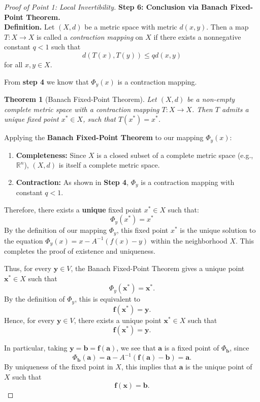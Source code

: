 \documentclass{article}
\newtheorem{theorem}{Theorem}
\begin{document}
\begin{proof}[Proof of Point 1: Local Invertibility]
\textbf{Step 6: Conclusion via Banach Fixed-Point Theorem.} \\

\textbf{Definition.} Let $(X, d)$ be a metric space with metric $d(x, y)$. Then a map $T: X \to X$ is called a \textit{contraction mapping} on $X$ if there exists a nonnegative constant $q < 1$ such that
\[
d(T(x), T(y)) \le q d(x, y)
\]
for all $x, y \in X$.

From \textbf{step 4} we know that $\Phi_y(x)$ is a contraction mapping.

\begin{theorem}[Banach Fixed-Point Theorem]
Let $(X, d)$ be a non-empty complete metric space with a contraction mapping $T: X \to X$. Then $T$ admits a unique fixed point $x^* \in X$, such that $T(x^*) = x^*$.
\end{theorem}

Applying the \textbf{Banach Fixed-Point Theorem} to our mapping $\Phi_y(x)$:
\begin{enumerate}
    \item \textbf{Completeness:} Since $X$ is a closed subset of a complete metric space (e.g., $\mathbb{R}^n$), $(X, d)$ is itself a complete metric space.
    \item \textbf{Contraction:} As shown in \textbf{Step 4}, $\Phi_y$ is a contraction mapping with constant $q < 1$.
\end{enumerate}

Therefore, there exists a \textbf{unique} fixed point $x^* \in X$ such that:
\[
\Phi_y(x^*) = x^*
\]
By the definition of our mapping $\Phi_y$, this fixed point $x^*$ is the unique solution to the equation $\Phi_y(x) = x - A^{-1}(f(x) - y)$  within the neighborhood $X$. This completes the proof of existence and uniqueness.

Thus, for every $\mathbf{y}\in V$, the Banach Fixed-Point Theorem gives a unique point $\mathbf{x}^*\in X$ such that
\[
\Phi_y(\mathbf{x}^*)=\mathbf{x}^*.
\]
By the definition of $\Phi_y$, this is equivalent to
\[
\mathbf{f}(\mathbf{x}^*)=\mathbf{y}.
\]
Hence, for every $\mathbf{y}\in V$, there exists a unique point $\mathbf{x}^*\in X$ such that
\[
\mathbf{f}(\mathbf{x}^*)=\mathbf{y}.
\]

In particular, taking $\mathbf{y}=\mathbf{b}=\mathbf{f}(\mathbf{a})$, we see that $\mathbf{a}$ is a fixed point of $\Phi_{\mathbf{b}}$, since
\[
\Phi_{\mathbf{b}}(\mathbf{a})
=
\mathbf{a}-A^{-1}(\mathbf{f}(\mathbf{a})-\mathbf{b})
=
\mathbf{a}.
\]
By uniqueness of the fixed point in $X$, this implies that $\mathbf{a}$ is the unique point of $X$ such that
\[
\mathbf{f}(\mathbf{x})=\mathbf{b}.
\]


\end{proof}
\end{document}
